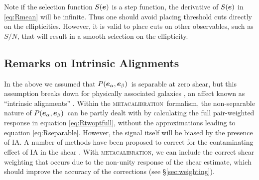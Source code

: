 \documentclass[iop]{emulateapj}
\newcommand{\snr}{$S/N$}
\newcommand{\vest}{\mbox{\boldmath $e$}}
\newcommand{\mcal}{\textsc{metacalibration}}
\newcommand{\probe}{\mbox{$P(\vest_\alpha, \vest_\beta)$}}
\begin{document}
Note if the selection function $S(\vest)$ is a step function, the derivative of
$S(\vest)$ in \ref{eq:Rmean} will be infinite.  Thus one should avoid placing
threshold cuts directly on the ellipticities.  However, it is valid to place
cuts on other observables, such as \snr, that will result in a smooth selection
on the ellipticity.


\subsection{Remarks on Intrinsic Alignments} \label{sec:IA}

In the above we assumed that \probe\ is separable at zero shear, but this
assumption breaks down for physically associated galaxies
\citep[e.g.][]{HirataIntrinsicAlign07}, an affect known as ``intrinsic
alignments'' \citep[IA; for a recent review, see][]{TroxelIAReview2015}.
Within the \mcal\ formalism, the non-separable nature of \probe\ can be partly
dealt with by calculating the full pair-weighted response in equation
\ref{eq:Rtwoptfull}, without the approximations leading to equation
\ref{eq:Rseparable}.  However, the signal itself will be biased by the presence
of IA.  A number of methods  have been proposed to correct for the
contaminating effect of IA in the shear \citep{TroxelIAReview2015}.  With
\mcal, we can include the correct shear
weighting that occurs due to the non-unity response of the shear estimate,
which should improve the accuracy of the corrections (see
\S \ref{sec:weighting}).
\end{document}
